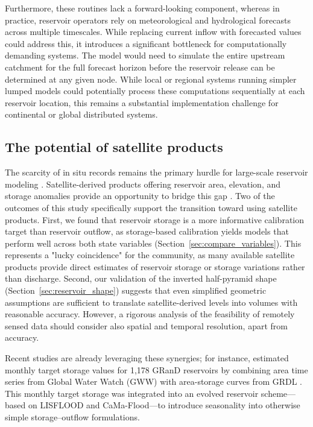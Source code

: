 \documentclass[hess, manuscript]{copernicus}
\begin{document}
Furthermore, these routines lack a forward-looking component, whereas in practice, reservoir operators rely on meteorological and hydrological forecasts across multiple timescales. While replacing current inflow with forecasted values could address this, it introduces a significant bottleneck for computationally demanding systems. The model would need to simulate the entire upstream catchment for the full forecast horizon before the reservoir release can be determined at any given node. While local or regional systems running simpler lumped models could potentially process these computations sequentially at each reservoir location, this remains a substantial implementation challenge for continental or global distributed systems.

\subsection{The potential of satellite products}
\label{sec:satellite_products}

The scarcity of in situ records remains the primary hurdle for large-scale reservoir modeling \citep{Shen2025}. Satellite-derived products offering reservoir area, elevation, and storage anomalies provide an opportunity to bridge this gap \citep{Zhao2018, Schwatke2020, Donchyts2022, Khandelwal2022, Hao2024, Hou2024}. Two of the outcomes of this study specifically support the transition toward using satellite products. First, we found that reservoir storage is a more informative calibration target than reservoir outflow, as storage-based calibration yields models that perform well across both state variables (Section~\ref{sec:compare_variables}). This represents a "lucky coincidence" for the community, as many available satellite products provide direct estimates of reservoir storage or storage variations rather than discharge. Second, our validation of the inverted half-pyramid shape (Section~\ref{sec:reservoir_shape}) suggests that even simplified geometric assumptions are sufficient to translate satellite-derived levels into volumes with reasonable accuracy. However, a rigorous analysis of the feasibility of remotely sensed data should consider also spatial and temporal resolution, apart from accuracy.

Recent studies are already leveraging these synergies; for instance, \citet{Shen2025} estimated monthly target storage values for 1,178 GRanD reservoirs by combining area time series from Global Water Watch (GWW) \citep{Donchyts2022} with area-storage curves from GRDL \citep{Hao2024}. This monthly target storage was integrated into an evolved reservoir scheme—based on LISFLOOD and CaMa-Flood—to introduce seasonality into otherwise simple storage--outflow formulations. 
\end{document}
